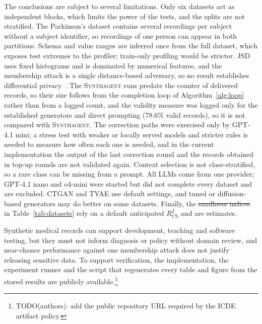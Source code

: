 \documentclass[conference]{IEEEtran}
\newcommand{\system}{\textsc{Synthagent}\xspace}
\providecommand{\DIFaddtex}[1]{{\protect\color{blue}\uwave{#1}}} %
\providecommand{\DIFdeltex}[1]{{\protect\color{red}\sout{#1}}}                      %
\providecommand{\DIFaddbegin}{} %
\providecommand{\DIFaddend}{} %
\providecommand{\DIFdelbegin}{} %
\providecommand{\DIFdelend}{} %
\providecommand{\DIFadd}[1]{\texorpdfstring{\DIFaddtex{#1}}{#1}} %
\providecommand{\DIFdel}[1]{\texorpdfstring{\DIFdeltex{#1}}{}} %
\newcommand{\DIFscaledelfig}{0.5}
\newlength{\DIFdelgraphicswidth} %
\newlength{\DIFdelgraphicsheight} %
\newcommand{\DIFaddincludegraphics}[2][]{{\color{blue}\fbox{\DIFOincludegraphics[#1]{#2}}}} %
\newcommand{\DIFdelincludegraphics}[2][]{%
\sbox{\DIFdelgraphicsbox}{\DIFOincludegraphics[#1]{#2}}%
\settoboxwidth{\DIFdelgraphicswidth}{\DIFdelgraphicsbox} %
\settoboxtotalheight{\DIFdelgraphicsheight}{\DIFdelgraphicsbox} %
\scalebox{\DIFscaledelfig}{%
\parbox[b]{\DIFdelgraphicswidth}{\usebox{\DIFdelgraphicsbox}\\[-\baselineskip] \rule{\DIFdelgraphicswidth}{0em}}\llap{\resizebox{\DIFdelgraphicswidth}{\DIFdelgraphicsheight}{%
\setlength{\unitlength}{\DIFdelgraphicswidth}%
\begin{picture}(1,1)%
\thicklines\linethickness{2pt} %
{\color[rgb]{1,0,0}\put(0,0){\framebox(1,1){}}}%
{\color[rgb]{1,0,0}\put(0,0){\line( 1,1){1}}}%
{\color[rgb]{1,0,0}\put(0,1){\line(1,-1){1}}}%
\end{picture}%
}\hspace*{3pt}}} %
} %
\DeclareRobustCommand{\DIFaddbegin}{\DIFOaddbegin \let\includegraphics\DIFaddincludegraphics} %
\DeclareRobustCommand{\DIFaddend}{\DIFOaddend \let\includegraphics\DIFOincludegraphics} %
\DeclareRobustCommand{\DIFdelbegin}{\DIFOdelbegin \let\includegraphics\DIFdelincludegraphics} %
\DeclareRobustCommand{\DIFdelend}{\DIFOaddend \let\includegraphics\DIFOincludegraphics} %
\begin{document}
The conclusions are subject to several limitations. Only six datasets act as independent blocks, which limits the power of the tests, and the splits are not stratified. The Parkinson's dataset contains several recordings per subject without a subject identifier, so recordings of one person can appear in both partitions. Schema and value ranges are inferred once from the full dataset, which exposes test extremes to the profiler; train-only profiling would be stricter. JSD uses fixed histograms and is dominated by numerical features, and the membership attack is a single distance-based adversary, so no result establishes differential privacy~\cite{dwork2014dp}. The \system runs predate the counter of delivered records, so their size follows from the completion loop of Algorithm~\ref{alg:loop} rather than from a logged count, and the validity measure was logged only for the established generators and direct prompting (78.6\% valid records), so it is not compared with \system. The correction paths were exercised only by GPT-4.1 mini; a stress test with weaker or locally served models and stricter rules is needed to measure how often each one is needed, and in the current implementation the output of the last correction round and the records obtained in top-up rounds are not validated again. Context selection is not class-stratified, so a rare class can be missing from a prompt. All LLMs come from one provider; GPT-4.1 nano and o4-mini were started but did not complete every dataset and are excluded. CTGAN and TVAE use default settings, and tuned or diffusion-based generators may do better on some datasets. Finally, the \DIFdelbegin \DIFdel{smallness indices }\DIFdelend \DIFaddbegin \DIFadd{sample-size ratios }\DIFaddend in Table~\ref{tab:datasets} rely on a default anticipated $R^2_{\mathrm{CS}}$ and are estimates.

Synthetic medical records can support development, teaching and software testing, but they must not inform diagnosis or policy without domain review, and near-chance performance against one membership attack does not justify releasing sensitive data. To support verification, the implementation, the experiment runner and the script that regenerates every table and figure from the stored results are publicly available.\footnote{TODO(authors): add the public repository URL required by the ICDE artifact policy.}

\end{document}
